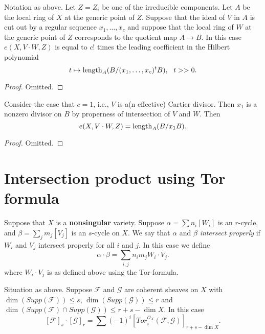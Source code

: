 \begin{lemma}
\label{lemma-formula-leading-coeff}
Notation as above.
Let $Z = Z_i$ be one of the irreducible components.
Let $A$ be the local ring of $X$ at the generic point
of $Z$. Suppose that the ideal of $V$ in $A$ is cut out by
a regular sequence $x_1,\ldots,x_c$ and suppose that the local
ring of $W$ at the generic point of $Z$ corresponds to the quotient
map  $A \to B$. In this case $e(X, V\cdot W, Z)$ is equal to
$c!$ times the leading coefficient in the Hilbert polynomial
$$
t \mapsto \hbox{length}_A(B/(x_1,\ldots,x_c)^tB), \ \ t>>0.
$$
\end{lemma}

\begin{proof}
Omitted.
\end{proof}

\begin{lemma}
\label{lemma-e-when-divisor}
Consider the case that $c=1$, i.e., $V$ is a(n effective) Cartier divisor.
Then $x_1$ is a nonzero divisor on $B$ by properness of intersection
of $V$ and $W$. Then
$$
e(X, V \cdot W, Z) = \hbox{length}_A(B/x_1B).
$$
\end{lemma}

\begin{proof}
Omitted.
\end{proof}


\section{Intersection product using Tor formula}
\label{section-tor-formula-intersection-product}

\noindent
Suppose that $X$ is a {\bf nonsingular} variety. Suppose
$\alpha = \sum n_i [W_i]$ is an $r$-cycle,
and $\beta = \sum_j m_j [V_j]$ is an $s$-cycle on $X$. We say
that $\alpha$ and $\beta$ {\it intersect properly} if 
$W_i$ and $V_j$ intersect properly for all $i$ and $j$.
In this case we define
$$
\alpha \cdot \beta = \sum_{i,j} n_i m_j W_i \cdot V_j.
$$
where $W_i \cdot V_j$ is as defined above using the Tor-formula.

\begin{lemma}
\label{lemma-tor-sheaves}
Situation as above.
Suppose ${\mathcal F}$ and ${\mathcal G}$ are coherent sheaves on $X$ with
$\dim(Supp({\mathcal F})) \leq s$, $\dim(Supp({\mathcal G})) \leq r$
and $\dim( Supp({\mathcal F}) \cap Supp({\mathcal G}) ) \leq r+s-\dim X$.
In this case
$$
[{\mathcal F}]_s \cdot [{\mathcal G}]_r = \sum (-1)^i 
[ Tor_i^{{\mathcal O}_X}({\mathcal F}, {\mathcal G}) ]_{r+s-\dim X}.
$$
\end{lemma}

